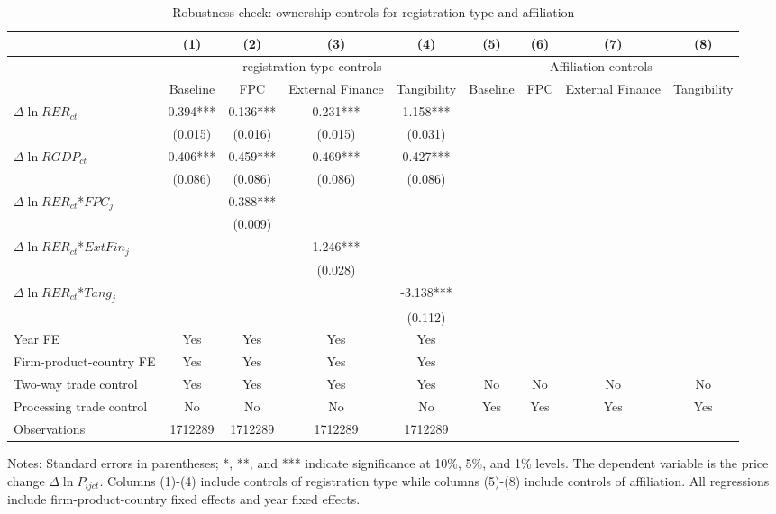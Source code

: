 \documentclass[12pt]{article}
\begin{document}
\begin{table}
	\centering
	\caption{Robustness check: ownership controls for registration type and affiliation}
	\begin{threeparttable}
		\begin{tabular}{lcccccccc}
			\toprule
			& (1)   & (2)   & (3)   & (4) &  (5)  &  (6)  & (7)  & (8)\\
			\midrule
			& \multicolumn{4}{c}{registration type controls} & \multicolumn{4}{c}{Affiliation controls}\\
			& Baseline & FPC   & External Finance & Tangibility & Baseline & FPC & External Finance & Tangibility\\
			\midrule
			$\Delta \ln RER_{ct}$ & 0.394*** & 0.136*** & 0.231*** & 1.158*** &&&&\\
			& (0.015) & (0.016) & (0.015) & (0.031) &&&&\\
			$\Delta \ln RGDP_{ct}$ & 0.406*** & 0.459*** & 0.469*** & 0.427*** &&&&\\
			& (0.086) & (0.086) & (0.086) & (0.086) &&&&\\
			$\Delta \ln RER_{ct}$*$FPC_{j}$ &       & 0.388*** &       &  &&&&\\
			&       & (0.009) &       &  &&&&\\
			$\Delta \ln RER_{ct}$*$ExtFin_{j}$ &       &       & 1.246*** &  &&&&\\
			&       &       & (0.028) &  &&&&\\
			$\Delta \ln RER_{ct}$*$Tang_{j}$ &       &       &       & -3.138*** &&&&\\
			&       &       &       & (0.112) &&&&\\
			Year FE  &  Yes   & Yes   & Yes   & Yes &&&&\\
			Firm-product-country FE &  Yes   & Yes   & Yes   & Yes &&&&\\
			Two-way trade control &  Yes   & Yes   & Yes   & Yes & No & No & No & No\\
			Processing trade control & No & No & No &  No &  Yes   & Yes   & Yes  & Yes \\
			Observations & 1712289 & 1712289 & 1712289 & 1712289 &&&&\\
			\bottomrule
		\end{tabular}
		\begin{tablenotes}
			\footnotesize
			\item[Notes:] Standard errors in parentheses; *, **, and *** indicate significance at 10\%, 5\%, and 1\% levels. The dependent variable is the price change $\Delta \ln P_{ijct}$. Columns (1)-(4) include controls of registration type while columns (5)-(8) include controls of affiliation. All regressions include firm-product-country fixed effects and year fixed effects.
		\end{tablenotes}
	\end{threeparttable}
	\label{tab.robust.ownership}
\end{table}
\end{document}
